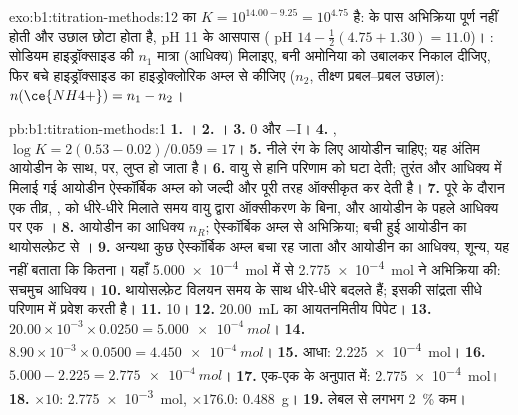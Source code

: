 \begin{solution}{exo:b1:titration-methods:12}
 का $K = 10^{14.00 - 9.25} = 10^{4.75}$ है:
 के पास अभिक्रिया पूर्ण नहीं होती और उछाल छोटा होता है,
pH 11 के आसपास ( pH $14 - \frac12(4.75 + 1.30) = 11.0$)। : सोडियम हाइड्रॉक्साइड की $n_1$ मात्रा (आधिक्य) मिलाइए, बनी अमोनिया को
उबालकर निकाल दीजिए, फिर बचे हाइड्रॉक्साइड का हाइड्रोक्लोरिक अम्ल से  कीजिए
($n_2$, तीक्ष्ण प्रबल--प्रबल उछाल): $n(\ce{NH4+}) = n_1 - n_2$।
\end{solution}

\begin{solution}{pb:b1:titration-methods:1}
\textbf{1.} ।
\textbf{2.} ।
\textbf{3.} 0 और $-$I।
\textbf{4.} , $\log K = 2(0.53 - 0.02)/0.059
= 17$।
\textbf{5.} नीले रंग के लिए आयोडीन चाहिए; यह अंतिम
आयोडीन के साथ,  पर, लुप्त हो जाता है।
\textbf{6.} वायु से हानि परिणाम को घटा देती; तुरंत और
आधिक्य में मिलाई गई आयोडीन ऐस्कॉर्बिक अम्ल को जल्दी और पूरी तरह ऑक्सीकृत कर देती है।
\textbf{7.} पूरे  के दौरान एक तीव्र, ,
 को धीरे-धीरे मिलाते समय वायु द्वारा ऑक्सीकरण के बिना, और आयोडीन के पहले
आधिक्य पर एक ।
\textbf{8.} आयोडीन का आधिक्य $n_R$; ऐस्कॉर्बिक अम्ल से अभिक्रिया; बची हुई
आयोडीन का थायोसल्फ़ेट से ।
\textbf{9.} अन्यथा कुछ ऐस्कॉर्बिक अम्ल बचा रह जाता और आयोडीन का
आधिक्य, शून्य, यह नहीं बताता कि कितना। यहाँ
\qty{5.000e-4}{mol} में से \qty{2.775e-4}{mol} ने अभिक्रिया की: सचमुच आधिक्य।
\textbf{10.} थायोसल्फ़ेट विलयन समय के साथ धीरे-धीरे बदलते हैं; इसकी
सांद्रता सीधे परिणाम में प्रवेश करती है।
\textbf{11.} 10।
\textbf{12.} \qty{20.00}{mL} का आयतनमितीय पिपेट।
\textbf{13.} $20.00 \times 10^{-3} \times 0.0250 = \qty{5.000e-4}{mol}$।
\textbf{14.} $8.90 \times 10^{-3} \times 0.0500 = \qty{4.450e-4}{mol}$।
\textbf{15.} आधा: \qty{2.225e-4}{mol}।
\textbf{16.} $5.000 - 2.225 = \qty{2.775e-4}{mol}$।
\textbf{17.} एक-एक के अनुपात में: \qty{2.775e-4}{mol}।
\textbf{18.} $\times 10$: \qty{2.775e-3}{mol}, $\times 176.0$:
\qty{0.488}{g}।
\textbf{19.} लेबल से लगभग \qty{2}{\percent} कम।

\end{solution}
